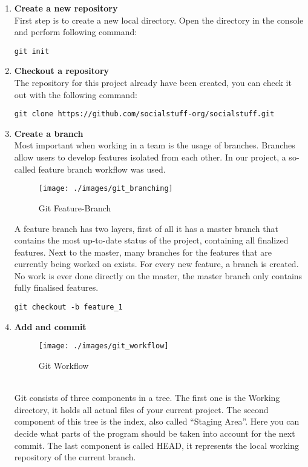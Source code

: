\begin{enumerate}
	\item \textbf{Create a new repository} \\
	First step is to create a new local directory. Open the directory in the console and perform following command:
	\begin{lstlisting}[label={lst:lstlisting2}]
		git init
	\end{lstlisting}
	\item \textbf{Checkout a repository} \\
	The repository for this project already have been created, you can check it out with the following command:
	\begin{lstlisting}[label={lst:lstlisting2}]
		git clone https://github.com/socialstuff-org/socialstuff.git
	\end{lstlisting}
	\item \textbf{Create a branch} \\
	Most important when working in a team is the usage of branches. Branches allow users to develop features isolated from each other. In our project, a so-called feature branch workflow was used. 
	\begin{figure}[h]
		\centering
		\texttt{[image: ./images/git\_branching]}
		\caption{Git Feature-Branch}
		\label{fig:gitbranching}
	\end{figure}
	A feature branch has two layers, first of all it has a master branch that contains the most up-to-date status of the project, containing all finalized features. Next to the master, many branches for the features that are currently being worked on exists. For every new feature, a branch is created. No work is ever done directly on the master, the master branch only contains fully finalised features.
	\begin{lstlisting}[label={lst:lstlisting2}]
		git checkout -b feature_1
	\end{lstlisting}
	\item \textbf{Add and commit} \\
	\begin{figure}[h]
		\centering
		\texttt{[image: ./images/git\_workflow]}
		\caption{Git Workflow}
		\label{fig:gitworkflow}
	\end{figure} \\
	Git consists of three components in a tree. The first one is the Working directory, it holds all actual files of your current project. The second component of this tree is the index, also called \enquote{Staging Area}. Here you can decide what parts of the program should be taken into account for the next commit. The last component is called HEAD, it represents the local working repository of the current branch.

\end{enumerate}
